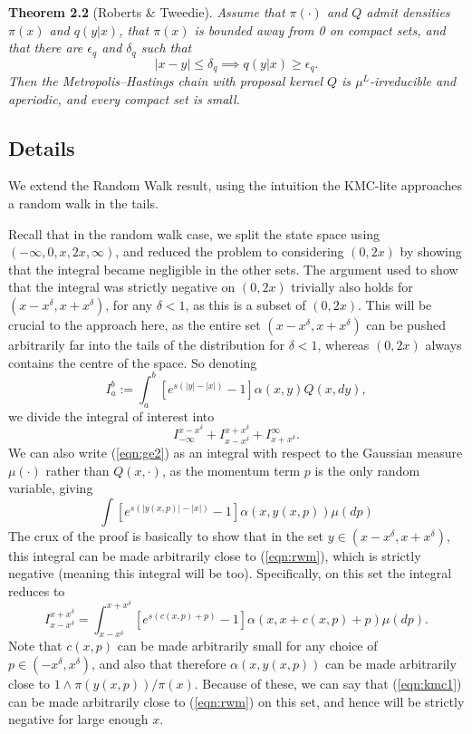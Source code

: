 \documentclass{article}
\begin{document}
\textbf{Theorem 2.2} (Roberts \& Tweedie).  {\itshape Assume that $\pi(\cdot)$ and $Q$ admit densities $\pi(x)$ and $q(y|x)$, that $\pi(x)$ is bounded away from 0 on compact sets, and that there are $\epsilon_q$ and $\delta_q$ such that
\[
|x - y| \leq \delta_q \implies q(y|x) \geq \epsilon_q.
\]
Then the Metropolis--Hastings chain with proposal kernel $Q$ is $\mu^L$-irreducible and aperiodic, and every compact set is small.}

\subsection{Details}

We extend the Random Walk result, using the intuition the KMC-lite approaches a random walk in the tails.

Recall that in the random walk case, we split the state space using $(-\infty,0,x,2x,\infty)$, and reduced the problem to considering $(0,2x)$ by showing that the integral became negligible in the other sets.  The argument used to show that the integral was strictly negative on $(0,2x)$ trivially
also holds for $(x-x^\delta,x+x^\delta)$, for any $\delta<1$, as this is a subset of $(0,2x)$.  This will be crucial to the approach here, as the entire set $(x - x^\delta,x + x^\delta)$ can be pushed arbitrarily far into the tails of the distribution for $\delta < 1$, whereas $(0,2x)$ always contains the centre of the space.  So denoting
\[
I_a^b := \int_a^b \left[ e^{s(|y| - |x|)} - 1 \right]\alpha(x,y)Q(x,dy),
\]
we divide the integral of interest into
\[
I_{-\infty}^{x - x^\delta} + I_{x - x^\delta}^{x + x^\delta} + I_{x+x^\delta}^\infty.
\]
We can also write (\ref{eqn:ge2}) as an integral with respect to the Gaussian measure $\mu(\cdot)$ rather than $Q(x,\cdot)$, as the momentum term $p$ is the only random variable, giving
\[
\int \left[ e^{s(|y(x,p)| - |x|)} - 1 \right] \alpha(x,y(x,p)) \mu(dp)
\]
The crux of the proof is basically to show that in the set $y \in (x - x^\delta,x+ x^{\delta})$, this integral can be made arbitrarily close to (\ref{eqn:rwm}), which is strictly negative (meaning this integral will be too).  Specifically, on this set the integral reduces to
\begin{equation} \label{eqn:kmc1}
I_{x - x^\delta}^{x + x^\delta} = \int_{x - x^\delta}^{x + x^\delta} \left[ e^{s(c(x,p) + p)} - 1 \right] \alpha(x,x + c(x,p) + p) \mu(dp).
\end{equation}
Note that $c(x,p)$ can be made arbitrarily small for any choice of $p \in (-x^\delta,x^\delta)$, and also that therefore $\alpha(x,y(x,p))$ can be made arbitrarily close to $1 \wedge \pi(y(x,p))/\pi(x)$.  Because of these, we can say that (\ref{eqn:kmc1}) can be made arbitrarily close to (\ref{eqn:rwm}) on this set, and hence will be strictly negative for large enough $x$.
\end{document}
